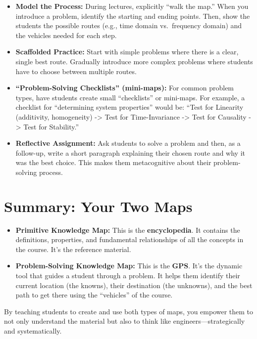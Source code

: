\documentclass[
  letterpaper,
  DIV=11,
  numbers=noendperiod]{scrreprt}
\begin{document}
\begin{itemize}
\item
  \textbf{Model the Process:} During lectures, explicitly ``walk the
  map.'' When you introduce a problem, identify the starting and ending
  points. Then, show the students the possible routes (e.g., time domain
  vs.~frequency domain) and the vehicles needed for each step.
\item
  \textbf{Scaffolded Practice:} Start with simple problems where there
  is a clear, single best route. Gradually introduce more complex
  problems where students have to choose between multiple routes.
\item
  \textbf{``Problem-Solving Checklists'' (mini-maps):} For common
  problem types, have students create small ``checklists'' or mini-maps.
  For example, a checklist for ``determining system properties'' would
  be: ``Test for Linearity (additivity, homogeneity) -\textgreater{}
  Test for Time-Invariance -\textgreater{} Test for Causality
  -\textgreater{} Test for Stability.''
\item
  \textbf{Reflective Assignment:} Ask students to solve a problem and
  then, as a follow-up, write a short paragraph explaining their chosen
  route and why it was the best choice. This makes them metacognitive
  about their problem-solving process.
\end{itemize}

\section{Summary: Your Two Maps}\label{summary-your-two-maps}

\begin{itemize}
\item
  \textbf{Primitive Knowledge Map:} This is the \textbf{encyclopedia}.
  It contains the definitions, properties, and fundamental relationships
  of all the concepts in the course. It's the reference material.
\item
  \textbf{Problem-Solving Knowledge Map:} This is the \textbf{GPS}. It's
  the dynamic tool that guides a student through a problem. It helps
  them identify their current location (the knowns), their destination
  (the unknowns), and the best path to get there using the ``vehicles''
  of the course.
\end{itemize}

By teaching students to create and use both types of maps, you empower
them to not only understand the material but also to think like
engineers---strategically and systematically.
\end{document}
